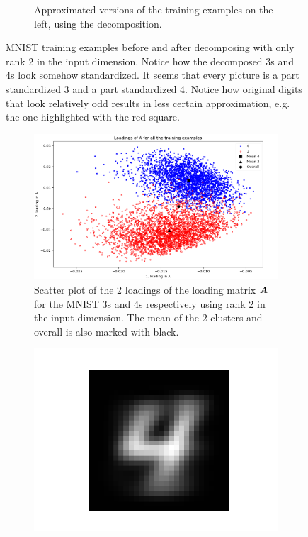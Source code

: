 \begin{figure}
\begin{subfigure}{0.45\linewidth}
        \captionsetup{width=.9\linewidth}
        \caption{Approximated versions of the training examples on the left, using the decomposition.}
    \end{subfigure}
    \captionsetup{width=.95\linewidth}
    \caption{MNIST training examples before and after decomposing with only rank 2 in the input dimension. Notice how the decomposed 3s and 4s look somehow standardized. It seems that every picture is a part standardized 3 and a part standardized 4. Notice how original digits that look relatively odd results in less certain approximation, e.g. the one highlighted with the red square.}
    \label{fig:decompExample3_4}
\end{figure}
\begin{figure}
    \centering
    \begin{subfigure}{0.99\linewidth}
        \includegraphics[width=\linewidth]{Pics/06_results/LoadingsOfAScatterMNIST.png}
        \caption{Scatter plot of the 2 loadings of the loading matrix $\boldsymbol{A}$ for the MNIST 3s and 4s respectively using rank 2 in the input dimension. The mean of the 2 clusters and overall is also marked with black.}
        \label{fig:loadingAMatrix}
    \end{subfigure}
    \begin{subfigure}{0.3\linewidth}
    \centering
        \includegraphics[width=.5\linewidth]{Pics/06_results/general4.png}

\end{subfigure}
\end{figure}
